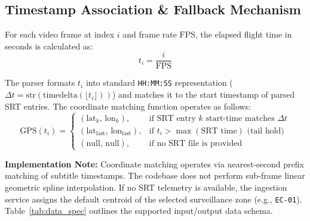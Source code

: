 \documentclass[12pt,a4paper]{article}
\begin{document}
\subsection{Timestamp Association \& Fallback Mechanism}
For each video frame at index $i$ and frame rate $\text{FPS}$, the elapsed flight time in seconds is calculated as:
\begin{equation}
t_i = \frac{i}{\text{FPS}}
\end{equation}

The parser formats $t_i$ into standard \texttt{HH:MM:SS} representation ($\Delta t = \text{str}(\text{timedelta}(\lfloor t_i \rfloor))$) and matches it to the start timestamp of parsed SRT entries. The coordinate matching function operates as follows:
\begin{equation}
\text{GPS}(t_i) = 
\begin{cases}
(\text{lat}_k, \, \text{lon}_k), & \text{if } \text{SRT entry } k \text{ start-time matches } \Delta t \\
(\text{lat}_{\text{last}}, \, \text{lon}_{\text{last}}), & \text{if } t_i > \max(\text{SRT time}) \text{ (tail hold)} \\
(\text{null}, \, \text{null}), & \text{if no SRT file is provided}
\end{cases}
\end{equation}

\textbf{Implementation Note:} Coordinate matching operates via nearest-second prefix matching of subtitle timestamps. The codebase does not perform sub-frame linear geometric spline interpolation. If no SRT telemetry is available, the ingestion service assigns the default centroid of the selected surveillance zone (e.g., \texttt{EC-01}). Table~\ref{tab:data_spec} outlines the supported input/output data schema.
\end{document}
